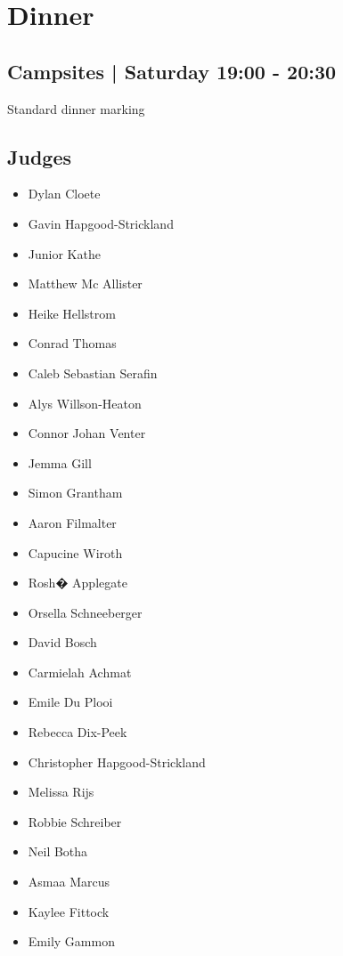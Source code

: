 \documentclass[10pt]{article}
\begin{document}
		\begin{minipage}{\linewidth}
		\setcounter{section}{20}
	\section{Dinner }
	\subsection*{Campsites | Saturday 19:00 - 20:30}

	Standard dinner marking

	\begin{multicols}{2}
	\subsection*{\faUsers \: Judges}
	\begin{itemize}
			\item Dylan Cloete
			\item Gavin Hapgood-Strickland
			\item Junior Kathe
			\item Matthew Mc Allister
			\item Heike Hellstrom
			\item Conrad Thomas
			\item Caleb Sebastian Serafin
			\item Alys Willson-Heaton
			\item Connor Johan Venter
			\item Jemma Gill
			\item Simon Grantham
			\item Aaron Filmalter
			\item Capucine Wiroth
			\item Rosh� Applegate
			\item Orsella Schneeberger
			\item David Bosch
			\item Carmielah Achmat
			\item Emile Du Plooi
			\item Rebecca Dix-Peek
			\item Christopher Hapgood-Strickland
			\item Melissa Rijs
			\item Robbie Schreiber
			\item Neil Botha
			\item Asmaa Marcus
			\item Kaylee Fittock
			\item Emily Gammon

\end{itemize}
\end{multicols}
\end{minipage}
\end{document}

